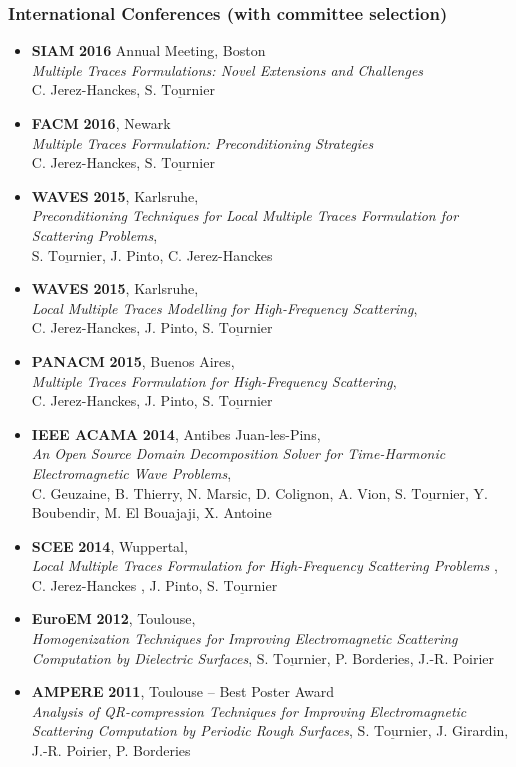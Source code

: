 \documentclass[a4paper,10pt,twoside]{article}
\newcommand\moi{$\underline{\textrm{S. Tournier}}$}
\begin{document}
\subsubsection*{International Conferences (with committee selection)}
\noindent
\begin{itemize}
\item[\textbullet]
  \textbf{SIAM} \textbf{2016} Annual Meeting, Boston\\
  \emph{Multiple Traces Formulations: Novel Extensions and Challenges}\\
  C. Jerez-Hanckes, \moi
\item[\textbullet]
  \textbf{FACM} \textbf{2016}, Newark\\
  \emph{Multiple Traces Formulation: Preconditioning Strategies}\\
  C. Jerez-Hanckes, \moi
\item[\textbullet]
  \textbf{WAVES} \textbf{2015}, Karlsruhe,\\
  \emph{Preconditioning Techniques
    for Local Multiple Traces Formulation for Scattering Problems},\\
  \moi,  J. Pinto, C. Jerez-Hanckes
\item[\textbullet]
  \textbf{WAVES} \textbf{2015}, Karlsruhe,\\
  \emph{Local Multiple Traces Modelling for High-Frequency Scattering},\\
  C. Jerez-Hanckes, J. Pinto, \moi
\item[\textbullet]
  \textbf{PANACM} \textbf{2015}, Buenos Aires,\\
  \emph{Multiple Traces Formulation for High-Frequency Scattering},\\
  C. Jerez-Hanckes, J. Pinto, \moi
\item[\textbullet]
\textbf{IEEE ACAMA} \textbf{2014}, Antibes Juan-les-Pins,\\
\emph{An Open Source Domain Decomposition Solver for
Time-Harmonic Electromagnetic Wave Problems},\\
C. Geuzaine, B. Thierry, N. Marsic, D. Colignon, A. Vion, \moi,
Y. Boubendir, M. El Bouajaji, X. Antoine
\item[\textbullet]
\textbf{SCEE} \textbf{2014}, Wuppertal,\\
\emph{Local Multiple Traces Formulation for High-Frequency Scattering Problems} ,\\
 C. Jerez-Hanckes , J. Pinto, \moi
\item[\textbullet]
\textbf{EuroEM} \textbf{2012}, Toulouse,\\
\emph{Homogenization  Techniques for Improving Electromagnetic
  Scattering Computation by Dielectric Surfaces},
\moi, P. Borderies, J.-R. Poirier
\item[\textbullet]
\textbf{AMPERE}
\textbf{2011}, Toulouse
-- \textsf{Best Poster Award}\\
\emph{Analysis of QR-compression
Techniques for Improving Electromagnetic Scattering Computation by
Periodic Rough Surfaces},
\moi, J. Girardin, J.-R. Poirier, P. Borderies


\end{itemize}
\end{document}
